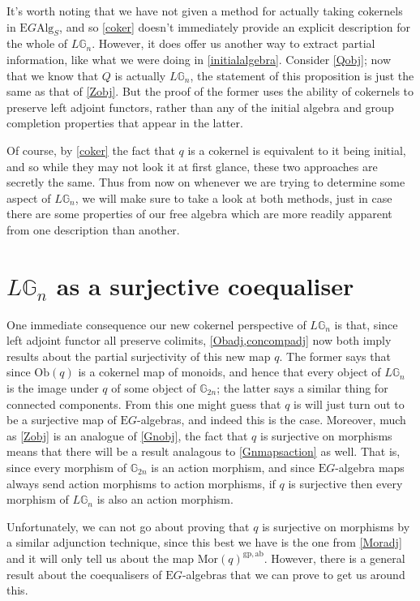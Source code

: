It's worth noting that we have not given a method for actually taking cokernels in $\mathrm{E}G\mathrm{Alg}_S$, and so \cref{coker} doesn't immediately provide an explicit description for the whole of $L\mathbb{G}_n$. However, it does offer us another way to extract partial information, like what we were doing in \cref{initialalgebra}. Consider \cref{Qobj}; now that we know that $Q$ is actually $L\mathbb{G}_n$, the statement of this proposition is just the same as that of \cref{Zobj}. But the proof of the former uses the ability of cokernels to preserve left adjoint functors, rather than any of the initial algebra and group completion properties that appear in the latter.

Of course, by \cref{coker} the fact that $q$ is a cokernel is equivalent to it being initial, and so while they may not look it at first glance, these two approaches are secretly the same. Thus from now on whenever we are trying to determine some aspect of $L\mathbb{G}_n$, we will make sure to take a look at both methods, just in case there are some properties of our free algebra which are more readily apparent from one description than another.

\section{$L\mathbb{G}_n$ as a surjective coequaliser}

One immediate consequence our new cokernel perspective of $L\mathbb{G}_n$ is that, since left adjoint functor all preserve colimits, \cref{Obadj,concompadj} now both imply results about the partial surjectivity of this new map $q$. The former says that since $\mathrm{Ob}(q)$ is a cokernel map of monoids, and hence that every object of $L\mathbb{G}_n$ is the image under $q$ of some object of $\mathbb{G}_{2n}$; the latter says a similar thing for connected components. From this one might guess that $q$ is will just turn out to be a surjective map of $\mathrm{E}G$-algebras, and indeed this is the case. Moreover, much as \cref{Zobj} is an analogue of \cref{Gnobj}, the fact that $q$ is surjective on morphisms means that there will be a result analagous to \cref{Gnmapsaction} as well. That is, since every morphism of $\mathbb{G}_{2n}$ is an action morphism, and since $\mathrm{E}G$-algebra maps always send action morphisms to action morphisms, if $q$ is surjective then every morphism of $L\mathbb{G}_n$ is also an action morphism. 

Unfortunately, we can not go about proving that $q$ is surjective on morphisms by a similar adjunction technique, since this best we have is the one from \cref{Moradj} and it will only tell us about the map $\mathrm{Mor}(q)^{\mathrm{gp}, \mathrm{ab}}$. However, there is a general result about the coequalisers of $\mathrm{E}G$-algebras that we can prove to get us around this.

